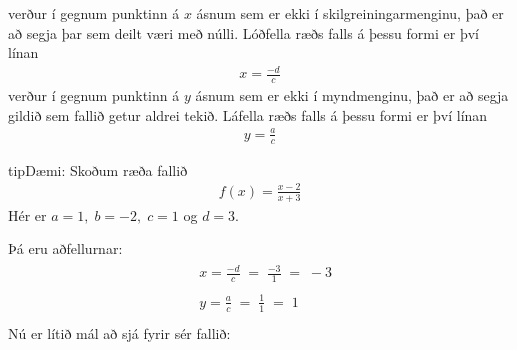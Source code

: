 \documentclass[a4paper,10pt,icelandic]{sphinxmanual}
\begin{document}
 verður í gegnum punktinn á \(x\) \sphinxhyphen{} ásnum sem er ekki í skilgreiningarmenginu, það er að segja þar sem deilt væri með núlli.
Lóðfella ræðs falls á þessu formi er því línan
\begin{equation*}
\begin{split}x=\frac{-d}{c}\end{split}
\end{equation*}
 verður í gegnum punktinn á \(y\) \sphinxhyphen{} ásnum sem er ekki í myndmenginu, það er að segja gildið sem fallið getur aldrei tekið.
Láfella ræðs falls á þessu formi er því línan
\begin{equation*}
\begin{split}y=\frac{a}{c}\end{split}
\end{equation*}
\begin{sphinxadmonition}{tip}{Dæmi:}
Skoðum ræða fallið
\begin{equation*}
\begin{split}f(x) = \frac{x-2}{x+3}\end{split}
\end{equation*}
Hér er \(a= 1, \; b =-2, \; c = 1\) og \(d = 3\).

Þá eru aðfellurnar:
\begin{equation*}
\begin{split}\begin{aligned}
& x = \frac{-d}{c} \; = \; \frac{-3}{1} \; = \; -3 \\
& \quad \\
& y = \frac{a}{c} \; = \; \frac{1}{1} \; = \; 1 \\
\end{aligned}\end{split}
\end{equation*}
Nú er lítið mál að sjá fyrir sér fallið:

\end{sphinxadmonition}
\end{document}
